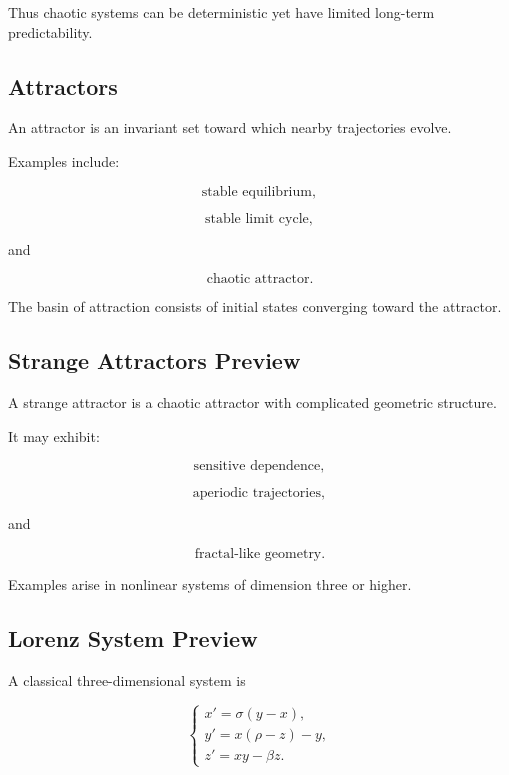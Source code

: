 Thus chaotic systems can be deterministic yet have limited long-term
predictability.

\subsection{Attractors}
\label{subsec:attractors}

An attractor is an invariant set toward which nearby trajectories evolve.

Examples include:

\[
\boxed{
\text{stable equilibrium},
}
\]

\[
\boxed{
\text{stable limit cycle},
}
\]

and

\[
\boxed{
\text{chaotic attractor}.
}
\]

The basin of attraction consists of initial states converging toward the
attractor.

\subsection{Strange Attractors Preview}
\label{subsec:strange-attractors-preview}

A strange attractor is a chaotic attractor with complicated geometric
structure.

It may exhibit:

\[
\boxed{
\text{sensitive dependence},
}
\]

\[
\boxed{
\text{aperiodic trajectories},
}
\]

and

\[
\boxed{
\text{fractal-like geometry}.
}
\]

Examples arise in nonlinear systems of dimension three or higher.

\subsection{Lorenz System Preview}
\label{subsec:lorenz-system-preview}

A classical three-dimensional system is

\[
\boxed{
\begin{cases}
x'
=
\sigma(y-x),
\\
y'
=
x(\rho-z)-y,
\\
z'
=
xy-\beta z.
\end{cases}
}
\]

